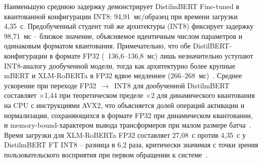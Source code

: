 \begin{table}[ht]
\centering
\caption{Производительность и размеры файлов моделей, бэкенд WASM}
\label{tab:latency}
\end{table}

Наименьшую среднюю задержку демонстрирует DistilmBERT Fine-tuned в квантованной конфигурации INT8: 94{,}91~мс/образец при времени загрузки 4{,}35~с. Предобученный студент той же архитектуры (INT8) фиксирует задержку 98{,}71~мс – близкое значение, объясняемое идентичным числом параметров и одинаковым форматом квантования. Примечательно, что обе DistilBERT-конфигурации в формате FP32 (~136{,}6–136{,}8~мс) лишь незначительно уступают INT8-аналогу дообученной модели, тогда как архитектурно более крупные mBERT и XLM-RoBERTa в FP32 вдвое медленнее (266–268~мс)~\cite{wang2024anatomizing}. Среднее ускорение при переходе FP32~$\rightarrow$~INT8 для дообученной DistilmBERT составляет $\times$1{,}44 при теоретическом пределе $\times$2 для динамического квантования на CPU с инструкциями AVX2, что объясняется долей операций активации и нормализации, сохраняющихся в формате FP32 при динамическом квантовании, и memory-bound-характером вывода трансформеров при малом размере батча~\cite{dettmers2022llmint8}. Время загрузки для XLM-RoBERTa FP32 составляет 27{,}08~с против 4{,}35~с у DistilmBERT FT INT8 – разница в 6{,}2 раза, критически значимая с точки зрения пользовательского восприятия при первом обращении к системе~\cite{wang2024anatomizing}.

